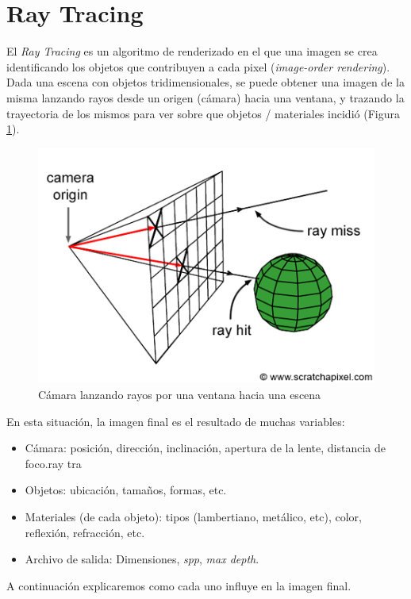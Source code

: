 \section{Ray Tracing} \label{sec:ray-tracing}

El \textit{Ray Tracing} es un algoritmo de renderizado en el que una imagen se
crea identificando los objetos que contribuyen a cada pixel (\textit{image-order
rendering}). Dada una escena con objetos tridimensionales, se puede obtener una
imagen de la misma lanzando rayos desde un origen (cámara) hacia una ventana, y
trazando la trayectoria de los mismos para ver sobre que objetos / materiales
incidió (Figura \ref{fig:rt-camera-throwing-rays-into-scene}).

\begin{figure}[H]
    \centering
    \includegraphics[width=.7\textwidth]{imgs/rt-camera-throwing-rays-into-scene.png}
    \caption{Cámara lanzando rayos por una ventana hacia una escena}
    \label{fig:rt-camera-throwing-rays-into-scene}
\end{figure}

En esta situación, la imagen final es el resultado de muchas variables:

\begin{itemize}
    \item Cámara: posición, dirección, inclinación, apertura de la lente,
        distancia de foco.ray tra
    \item Objetos: ubicación, tamaños, formas, etc.
    \item Materiales (de cada objeto): tipos (lambertiano, metálico, etc),
    color, reflexión, refracción, etc.
    \item Archivo de salida: Dimensiones, \textit{spp}, \textit{max depth}.
\end{itemize}

A continuación explicaremos como cada uno influye en la imagen final.

